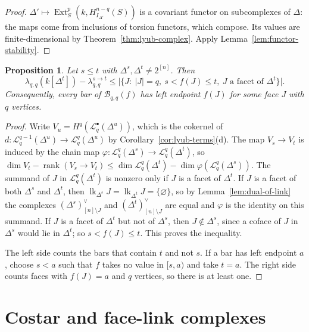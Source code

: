 \documentclass[11pt]{article}
\theoremstyle{plain}
\newtheorem{proposition}[theorem]{Proposition}
\theoremstyle{definition}
\newcommand{\kk}{k}
\newcommand{\link}{\operatorname{lk}}
\newcommand{\Ext}{\operatorname{Ext}}
\newcommand{\rank}{\operatorname{rank}}
\newcommand{\Hloc}[2]{H^{#1}_{#2}}
\newcommand{\Lc}{\mathcal L}
\begin{document}
\begin{proof}
$\Delta'\mapsto\Ext^p_S(\kk,\Hloc{n-q}{I_{\Delta'}}(S))$ is a covariant functor on subcomplexes of $\Delta$: the maps come
from inclusions of torsion functors, which compose. Its values are finite-dimensional by
Theorem~\ref{thm:lyub-complex}. Apply Lemma~\ref{lem:functor-stability}.
\end{proof}

\begin{proposition}\label{prop:top-row}
Let $s\le t$ with $\Delta^s,\Delta^t\ne2^{[n]}$. Then
\[
\lambda_{q,q}(\kk[\Delta^t])-\lambda^{s\to t}_{q,q}\le\bigl|\{J:\ |J|=q,\ s<f(J)\le t,\ J\text{ a facet of }\Delta^t\}\bigr|.
\]
Consequently, every bar of $\mathcal B_{q,q}(f)$ has left endpoint $f(J)$ for some face $J$ with $q$ vertices.
\end{proposition}

\begin{proof}
Write $V_u=H^q(\Lc^\bullet_q(\Delta^u))$, which is the cokernel of $d\colon\Lc^{q-1}_q(\Delta^u)\to\Lc^q_q(\Delta^u)$ by
Corollary~\ref{cor:lyub-terms}(d). The map $V_s\to V_t$ is induced by the chain map $\varphi\colon\Lc^q_q(\Delta^s)\to\Lc^q_q(\Delta^t)$,
so $\dim V_t-\rank(V_s\to V_t)\le\dim\Lc^q_q(\Delta^t)-\dim\varphi(\Lc^q_q(\Delta^s))$. The summand of $J$ in
$\Lc^q_q(\Delta^t)$ is nonzero only if $J$ is a facet of $\Delta^t$. If $J$ is a facet of both $\Delta^s$ and $\Delta^t$,
then $\link_{\Delta^s}J=\link_{\Delta^t}J=\{\varnothing\}$, so by Lemma~\ref{lem:dual-of-link} the complexes
$(\Delta^s)^\vee_{[n]\setminus J}$ and $(\Delta^t)^\vee_{[n]\setminus J}$ are equal and $\varphi$ is the identity on this
summand. If $J$ is a facet of $\Delta^t$ but not of $\Delta^s$, then $J\notin\Delta^s$, since a coface of $J$ in $\Delta^s$
would lie in $\Delta^t$; so $s<f(J)\le t$. This proves the inequality.

The left side counts the bars that contain $t$ and not $s$. If a bar has left endpoint $a$, choose $s<a$ such that
$f$ takes no value in $[s,a)$ and take $t=a$. The right side counts faces with $f(J)=a$ and $q$ vertices, so there is
at least one.
\end{proof}

\section{Costar and face-link complexes}\label{sec:link-model}
\end{document}
